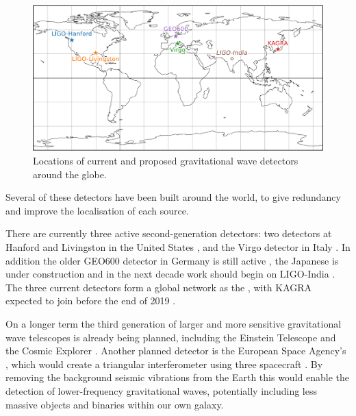 \begin{colsection}
\begin{colsection}
\begin{figure}[t]
    \begin{center}
        \includegraphics[width=0.9\linewidth]{images/global.pdf}
    \end{center}
    \caption[Locations of gravitational wave detectors]{
        Locations of current and proposed gravitational wave detectors around the globe.
        }\label{fig:global}
\end{figure}

Several of these detectors have been built around the world, to give redundancy and improve the localisation of each source.

There are currently three active second-generation detectors: two  detectors at Hanford and Livingston in the United States \citep{LIGO}, and the  Virgo detector in Italy \citep{Virgo}. In addition the older GEO600 detector in Germany is still active \citep{GEO600}, the Japanese  is under construction \citep{KAGRA} and in the next decade work should begin on LIGO-India \citep{LIGO_India}. The three current detectors form a global network as the , with KAGRA expected to join before the end of 2019 \citep{LIGO-Virgo, LIGO-Virgo-KAGRA}.

On a longer term the third generation of larger and more sensitive gravitational wave telescopes is already being planned, including the Einstein Telescope \citep{EinsteinTelescope} and the Cosmic Explorer \citep{CosmicExplorer}. Another planned detector is the European Space Agency's , which would create a triangular interferometer using three spacecraft \citep{LISA}. By removing the background  seismic vibrations from the Earth this would enable the detection of lower-frequency gravitational waves, potentially including less massive objects and binaries within our own galaxy.

\newpage

\end{colsection}


\end{colsection}
